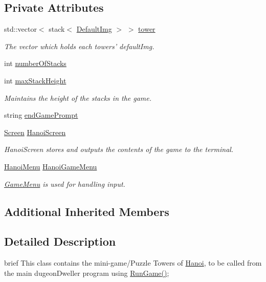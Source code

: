\subsection*{Private Attributes}
\begin{DoxyCompactItemize}
\item 
std\-::vector$<$ stack$<$ \hyperlink{classDefaultImg}{Default\-Img} $>$ $>$ \hyperlink{classHanoi_afe67c656c8ce8c7006e8b7f23fbe9ae9}{tower}
\begin{DoxyCompactList}\small\item\em The vector which holds each towers' default\-Img. \end{DoxyCompactList}\item 
int \hyperlink{classHanoi_abcdaa5a4b56f9c3916bf49e054e1cf8c}{number\-Of\-Stacks}
\item 
int \hyperlink{classHanoi_a826f3bc786cb5c7b6499508d0b8bc9b4}{max\-Stack\-Height}
\begin{DoxyCompactList}\small\item\em Maintains the height of the stacks in the game. \end{DoxyCompactList}\item 
string \hyperlink{classHanoi_a43513810a88b1c43a61dc26838ce6446}{end\-Game\-Prompt}
\item 
\hyperlink{classScreen}{Screen} \hyperlink{classHanoi_a1b9bfd6a0428f772d78b66a5a3268c4c}{Hanoi\-Screen}
\begin{DoxyCompactList}\small\item\em Hanoi\-Screen stores and outputs the contents of the game to the terminal. \end{DoxyCompactList}\item 
\hyperlink{classHanoiMenu}{Hanoi\-Menu} \hyperlink{classHanoi_a7d73005d59c4f2134ffd564964ab3f49}{Hanoi\-Game\-Menu}
\begin{DoxyCompactList}\small\item\em \hyperlink{classGameMenu}{Game\-Menu} is used for handling input. \end{DoxyCompactList}\end{DoxyCompactItemize}
\subsection*{Additional Inherited Members}


\subsection{Detailed Description}
brief This class contains the mini-\/game/\-Puzzle Towers of \hyperlink{classHanoi}{Hanoi}, to be called from the main dugeon\-Dweller program using \hyperlink{classHanoi_a294a2a533b7f3305391aa880f7a0eb36}{Run\-Game()}; 

